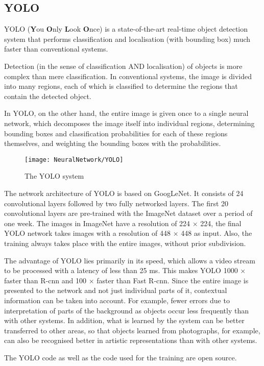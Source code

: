 	
\subsection{YOLO}

YOLO (\textbf{Y}ou \textbf{O}nly \textbf{L}ook \textbf{O}nce) is a state-of-the-art real-time object detection system that performs classification and localisation (with bounding box) much faster than conventional systems.\cite{Redmon:2021}

Detection (in the sense of classification AND localisation) of objects is more complex than mere classification. In conventional systems, the image is divided into many regions, each of which is classified to determine the regions that contain the detected object. \cite{Chablani:2017}

In YOLO, on the other hand, the entire image is given once to a single neural network, which decomposes the image itself into individual regions, determining bounding boxes and classification probabilities for each of these regions themselves, and weighting the bounding boxes with the probabilities.

\begin{figure}[H]
	\begin{center}
		\texttt{[image: NeuralNetwork/YOLO]}
		\caption{The YOLO system} 
		\label{YOLO}
	\end{center}
\end{figure}

The network architecture of YOLO is based on GoogLeNet. It consists of 24 convolutional layers followed by two fully networked layers. The first 20 convolutional layers are pre-trained with the ImageNet dataset over a period of one week. The images in ImageNet have a resolution of 224 $\times$ 224, the final YOLO network takes images with a resolution of 448 $\times$ 448 as input. Also, the training always takes place with the entire images, without prior subdivision. \cite{Redmon:2015}

The advantage of YOLO lies primarily in its speed, which allows a video stream to be processed with a latency of less than 25 ms. This makes YOLO 1000 $\times$ faster than R-\ac{cnn} and 100 $\times$ faster than Fast R-\ac{cnn}. Since the entire image is presented to the network and not just individual parts of it, contextual information can be taken into account. For example, fewer errors due to interpretation of parts of the background as objects occur less frequently than with other systems. In addition, what is learned by the system can be better transferred to other areas, so that objects learned from photographs, for example, can also be recognised better in artistic representations than with other systems.  \cite{Redmon:2015,Redmon:2021}

The YOLO code as well as the code used for the training are open source.

